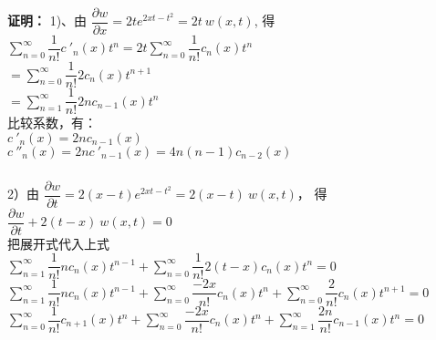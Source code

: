 \begin{frame}
	\frametitle{  }
	\textbf{证明：}	1)、由 $  \dfrac{\partial w}{\partial x} =2t e^{2xt-t^2} =2t ~w(x,t) $, 得 \\ 
	$ \sum\limits_{n=0}^{\infty} \dfrac{1}{n!}  c~'_n(x) t^n  = 2t  \sum\limits_{n=0}^{\infty} \dfrac{1}{n!}  c_n(x) t^n $ \\
	\hspace{2.3cm}	$=  \sum\limits_{n=0}^{\infty} \dfrac{1}{n!}  2c_{n}(x) t^{n+1} $\\
	\hspace{2.3cm}	$=  \sum\limits_{n=1}^{\infty} \dfrac{1}{n!}  2nc_{n-1}(x) t^{n}   $ \\
	比较系数，有：\\
	\hspace{2.1cm}	{ $c~'_n(x)=2nc_{n-1}(x)$} \\  \vspace{0.3cm}
	\hspace{2.1cm}	$c~''_n(x)=2nc~'_{n-1}(x)=4n(n-1)c_{n-2}(x)$ \\  	
\end{frame}

\begin{frame}
	\frametitle{  }
	2）由 $  \dfrac{\partial w}{\partial t} =2(x-t) e^{2xt-t^2} =2(x-t) ~w(x,t) $， 得 \\ 
	\hspace{2.1cm}		$  \dfrac{\partial w}{\partial t} +2(t-x) ~w(x,t) =0$ \\ 
	把展开式代入上式\\ 
	{$  \sum\limits_{n=1}^{\infty} \dfrac{1}{n!}n c_n(x) t^{n-1} +\sum\limits_{n=0}^{\infty} \dfrac{1}{n!}2(t-x) c_n(x)t^n=0$ } \\ \vspace{0.3cm}
	{$ \sum\limits_{n=1}^{\infty} \dfrac{1}{n!}n c_n(x) t^{n-1} +\sum\limits_{n=0}^{\infty} \dfrac{-2x}{n!} c_n(x)t^n +\sum\limits_{n=0}^{\infty}\dfrac{2}{n!} c_n(x)t^{n+1}=0$ } \\ \vspace{0.3cm}
	{$ \sum\limits_{n=0}^{\infty} \dfrac{1}{n!} c_{n+1}(x) t^{n} +\sum\limits_{n=0}^{\infty} \dfrac{-2x}{n!} c_n(x)t^n +\sum\limits_{n=1}^{\infty}\dfrac{2n}{n!} c_{n-1}(x)t^n=0$ } 
\end{frame}

